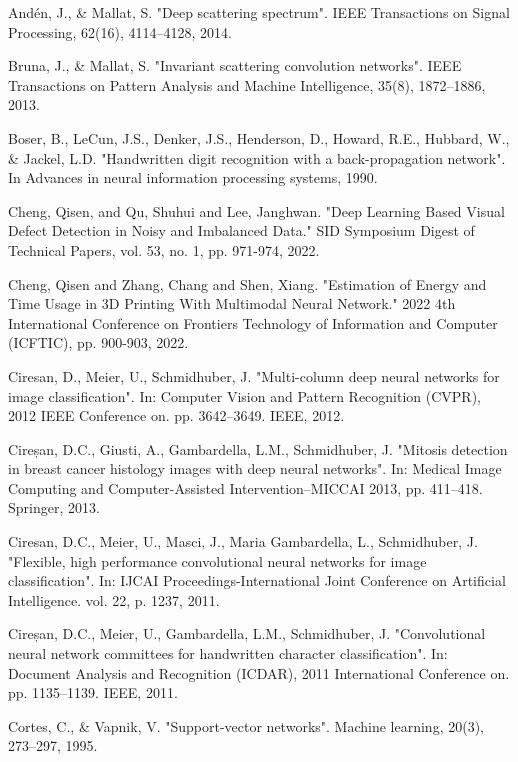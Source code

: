 \documentclass{article}
\begin{document}
\begin{thebibliography}{99}
   Andén, J., \& Mallat, S. "Deep scattering spectrum". IEEE Transactions on Signal Processing, 62(16), 4114–4128, 2014.

   Bruna, J., \& Mallat, S. "Invariant scattering convolution networks". IEEE Transactions on Pattern Analysis and Machine Intelligence, 35(8), 1872–1886, 2013.

   Boser, B., LeCun, J.S., Denker, J.S., Henderson, D., Howard, R.E., Hubbard, W., \& Jackel, L.D. "Handwritten digit recognition with a back-propagation network". In Advances in neural information processing systems, 1990.

   Cheng, Qisen, and Qu, Shuhui and Lee, Janghwan. "Deep Learning Based Visual Defect Detection in Noisy and Imbalanced Data." SID Symposium Digest of Technical Papers, vol. 53, no. 1, pp. 971-974, 2022.

   Cheng, Qisen and Zhang, Chang and Shen, Xiang. "Estimation of Energy and Time Usage in 3D Printing With Multimodal Neural Network." 2022 4th International Conference on Frontiers Technology of Information and Computer (ICFTIC), pp. 900-903, 2022.

   Ciresan, D., Meier, U., Schmidhuber, J. "Multi-column deep neural networks for image classification". In: Computer Vision and Pattern Recognition (CVPR), 2012 IEEE Conference on. pp. 3642–3649. IEEE, 2012.

   Cireșan, D.C., Giusti, A., Gambardella, L.M., Schmidhuber, J. "Mitosis detection in breast cancer histology images with deep neural networks". In: Medical Image Computing and Computer-Assisted Intervention–MICCAI 2013, pp. 411–418. Springer, 2013.

   Ciresan, D.C., Meier, U., Masci, J., Maria Gambardella, L., Schmidhuber, J. "Flexible, high performance convolutional neural networks for image classification". In: IJCAI Proceedings-International Joint Conference on Artificial Intelligence. vol. 22, p. 1237, 2011.

   Cireșan, D.C., Meier, U., Gambardella, L.M., Schmidhuber, J. "Convolutional neural network committees for handwritten character classification". In: Document Analysis and Recognition (ICDAR), 2011 International Conference on. pp. 1135–1139. IEEE, 2011.

 Cortes, C., \& Vapnik, V. "Support-vector networks". Machine learning, 20(3), 273–297, 1995.


\end{thebibliography}
\end{document}

